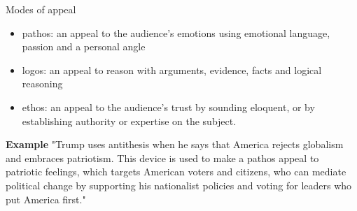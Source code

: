 \documentclass[11pt,a4paper,oneside]{book}
\begin{document}
\clearpage{}\label{note-modes-of-appeal}
{\displayfont\color{navy}\fontsize{30}{34}\selectfont Modes of appeal\par}\vspace{4mm}

\begin{itemize}
\item pathos: an appeal to the audience’s emotions using emotional language, passion and a personal angle
\item logos: an appeal to reason with arguments, evidence, facts and logical reasoning
\item ethos: an appeal to the audience’s trust by sounding eloquent, or by establishing authority or expertise on the subject.
\end{itemize}
\textbf{Example} "Trump uses antithesis when he says that America rejects globalism and embraces patriotism. This device is used to make a pathos appeal to patriotic feelings, which targets American voters and citizens, who can mediate political change by supporting his nationalist policies and voting for leaders who put America first."
\end{document}
